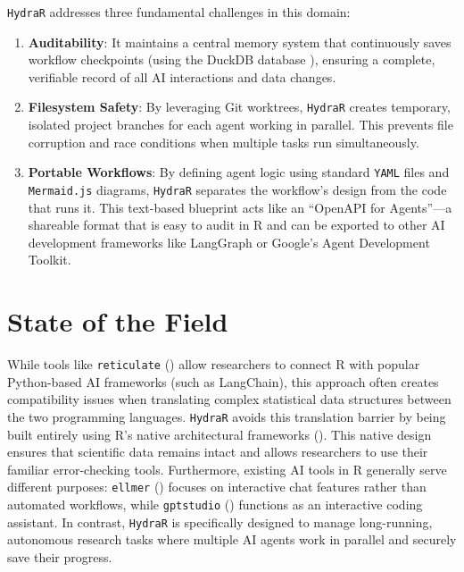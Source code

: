 \documentclass[
]{article}
\begin{document}
\texttt{HydraR} addresses three fundamental challenges in this domain:
\begin{enumerate}
    \item \textbf{Auditability}: It maintains a central memory system that continuously saves workflow checkpoints (using the DuckDB database ), ensuring a complete, verifiable record of all AI interactions and data changes.
    \item \textbf{Filesystem Safety}: By leveraging Git worktrees, \texttt{HydraR} creates temporary, isolated project branches for each agent working in parallel. This prevents file corruption and race conditions when multiple tasks run simultaneously.
    \item \textbf{Portable Workflows}: By defining agent logic using standard \texttt{YAML} files and \texttt{Mermaid.js} diagrams, \texttt{HydraR} separates the workflow's design from the code that runs it. This text-based blueprint acts like an ``OpenAPI for Agents''---a shareable format that is easy to audit in R and can be exported to other AI development frameworks like LangGraph or Google's Agent Development Toolkit.
\end{enumerate}



\section{State of the Field}\label{state-of-the-field}

While tools like \texttt{reticulate} () allow researchers to connect R with popular Python-based AI frameworks (such as LangChain), this approach often creates compatibility issues when translating complex statistical data structures between the two programming languages. \texttt{HydraR} avoids this translation barrier by being built entirely using R's native architectural frameworks (). This native design ensures that scientific data remains intact and allows researchers to use their familiar error-checking tools. Furthermore, existing AI tools in R generally serve different purposes: \texttt{ellmer} () focuses on interactive chat features rather than automated workflows, while \texttt{gptstudio} () functions as an interactive coding assistant. In contrast, \texttt{HydraR} is specifically designed to manage long-running, autonomous research tasks where multiple AI agents work in parallel and securely save their progress.
\end{document}
